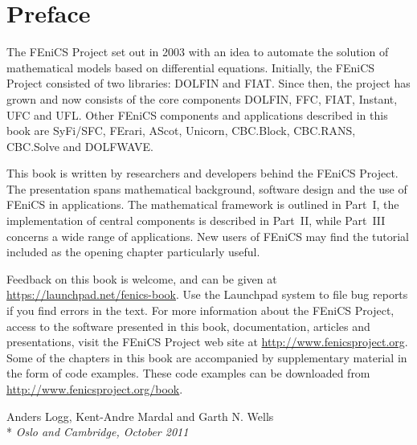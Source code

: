 \tableofcontents

\chapter*{Preface}

\thispagestyle{empty}

The FEniCS Project set out in 2003 with an idea to automate the
solution of mathematical models based on differential equations.
Initially, the FEniCS Project consisted of two libraries: DOLFIN and
FIAT. Since then, the project has grown and now consists of the core
components DOLFIN, FFC, FIAT, Instant, UFC and UFL. Other FEniCS
components and applications described in this book are SyFi/SFC,
FErari, AScot, Unicorn, CBC.Block, CBC.RANS, CBC.Solve and DOLFWAVE.

This book is written by researchers and developers behind the FEniCS
Project. The presentation spans mathematical background, software
design and the use of FEniCS in applications. The mathematical
framework is outlined in Part~I, the implementation of central
components is described in Part~II, while Part~III concerns a wide
range of applications. New users of FEniCS may find the tutorial
included as the opening chapter particularly useful.

Feedback on this book is welcome, and can be given at
\url{https://launchpad.net/fenics-book}. Use the Launchpad system to
file bug reports if you find errors in the text. For more information
about the FEniCS Project, access to the software presented in this
book, documentation, articles and presentations, visit the FEniCS
Project web site at \url{http://www.fenicsproject.org}. Some of the
chapters in this book are accompanied by supplementary material in the
form of code examples. These code examples can be downloaded from
\url{http://www.fenicsproject.org/book}.

\vspace{1em}

\noindent
Anders Logg, Kent-Andre Mardal and Garth N. Wells \\*
\emph{Oslo and Cambridge, October 2011}

